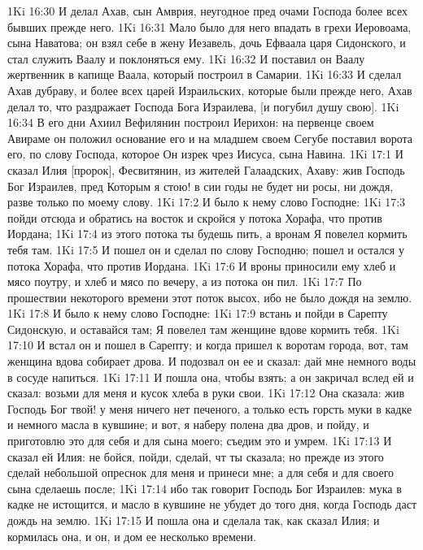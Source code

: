 \vs 1Ki 16:30 И делал Ахав, сын Амврия, неугодное пред очами Господа более всех бывших прежде него.
\vs 1Ki 16:31 Мало было для него впадать в грехи Иеровоама, сына Наватова; он взял себе в жену Иезавель, дочь Ефваала царя Сидонского, и стал служить Ваалу и поклоняться ему.
\vs 1Ki 16:32 И поставил он Ваалу жертвенник в капище Ваала, который построил в Самарии.
\vs 1Ki 16:33 И сделал Ахав дубраву, и более всех царей Израильских, которые были прежде него, Ахав делал то, что раздражает Господа Бога Израилева, [и погубил душу свою].
\vs 1Ki 16:34 В его дни Ахиил Вефилянин построил Иерихон: на первенце своем Авираме он положил основание его и на младшем своем  Сегубе поставил ворота его, по слову Господа, которое Он изрек чрез Иисуса, сына Навина.
\vs 1Ki 17:1 И сказал Илия [пророк], Фесвитянин, из жителей Галаадских, Ахаву: жив Господь Бог Израилев, пред Которым я стою! в сии годы не будет ни росы, ни дождя, разве только по моему слову.
\vs 1Ki 17:2 И было к нему слово Господне:
\vs 1Ki 17:3 пойди отсюда и обратись на восток и скройся у потока Хорафа, что против Иордана;
\vs 1Ki 17:4 из этого потока ты будешь пить, а вронам Я повелел кормить тебя там.
\vs 1Ki 17:5 И пошел он и сделал по слову Господню; пошел и остался у потока Хорафа, что против Иордана.
\vs 1Ki 17:6 И вроны приносили ему хлеб и мясо поутру, и хлеб и мясо по вечеру, а из потока он пил.
\vs 1Ki 17:7 По прошествии некоторого времени этот поток высох, ибо не было дождя на землю.
\vs 1Ki 17:8 И было к нему слово Господне:
\vs 1Ki 17:9 встань и пойди в Сарепту Сидонскую, и оставайся там; Я повелел там женщине вдове кормить тебя.
\vs 1Ki 17:10 И встал он и пошел в Сарепту; и когда пришел к воротам города, вот, там женщина вдова собирает дрова. И подозвал он ее и сказал: дай мне немного воды в сосуде напиться.
\vs 1Ki 17:11 И пошла она, чтобы взять; а он закричал вслед ей и сказал: возьми для меня и кусок хлеба в руки свои.
\vs 1Ki 17:12 Она сказала: жив Господь Бог твой! у меня ничего нет печеного, а только есть горсть муки в кадке и немного масла в кувшине; и вот, я наберу полена два дров, и пойду, и приготовлю это для себя и для сына моего; съедим это и умрем.
\vs 1Ki 17:13 И сказал ей Илия: не бойся, пойди, сделай, чт ты сказала; но прежде из этого сделай небольшой опреснок для меня и принеси мне; а для себя и для своего сына сделаешь после;
\vs 1Ki 17:14 ибо так говорит Господь Бог Израилев: мука в кадке не истощится, и масло в кувшине не убудет до того дня, когда Господь даст дождь на землю.
\vs 1Ki 17:15 И пошла она и сделала так, как сказал Илия; и кормилась она, и он, и дом ее несколько времени.
